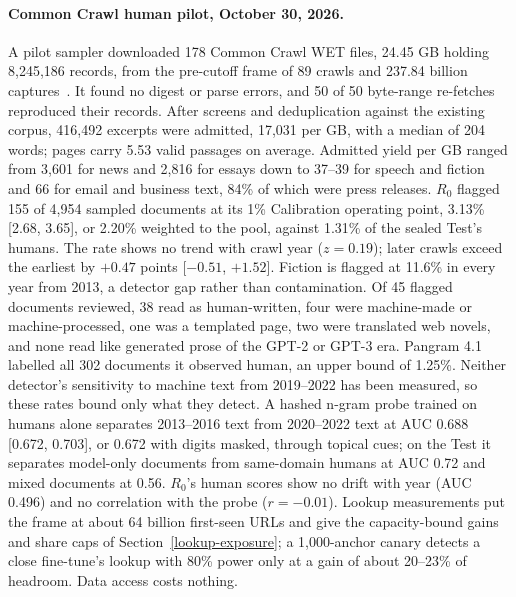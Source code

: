 \paragraph{Common Crawl human pilot, October 30, 2026.}\label{cc-pilot-evidence}
A pilot sampler downloaded 178 Common Crawl WET files, 24.45 GB holding
8,245,186 records, from the pre-cutoff frame of 89 crawls and 237.84 billion
captures~\cite{ccpilot}. It found no digest or parse errors, and 50 of 50
byte-range re-fetches reproduced their records. After screens and deduplication
against the existing corpus, 416,492 excerpts were admitted, 17,031 per GB, with
a median of 204 words; pages carry 5.53 valid passages on average. Admitted
yield per GB ranged from 3,601 for news and 2,816 for essays down to 37--39 for
speech and fiction and 66 for email and business text, 84\% of which were press
releases. \(R_0\) flagged 155 of 4,954 sampled documents at its 1\%
Calibration operating point, 3.13\% [2.68, 3.65], or 2.20\% weighted to the
pool, against 1.31\% of the sealed Test's humans. The rate shows no trend with
crawl year (\(z=0.19\)); later crawls exceed the earliest by \(+0.47\) points
[\(-0.51\), \(+1.52\)]. Fiction is flagged at 11.6\% in every year from 2013, a
detector gap rather than contamination. Of 45 flagged documents reviewed, 38
read as human-written, four were machine-made or machine-processed, one was a
templated page, two were translated web novels, and none read like generated
prose of the GPT-2 or GPT-3 era. Pangram 4.1 labelled all 302 documents it
observed human, an upper bound of 1.25\%. Neither detector's sensitivity to
machine text from 2019--2022 has been measured, so these rates bound only what
they detect. A hashed n-gram probe trained on humans alone separates 2013--2016
text from 2020--2022 text at AUC 0.688 [0.672, 0.703], or 0.672 with digits
masked, through topical cues; on the Test it separates model-only documents
from same-domain humans at AUC 0.72 and mixed documents at 0.56. \(R_0\)'s human
scores show no drift with year (AUC 0.496) and no correlation with the probe
(\(r=-0.01\)). Lookup measurements put the frame at about 64 billion first-seen
URLs and give the capacity-bound gains and share caps of
Section~\ref{lookup-exposure}; a 1,000-anchor canary detects a close fine-tune's
lookup with 80\% power only at a gain of about 20--23\% of headroom. Data access
costs nothing.

